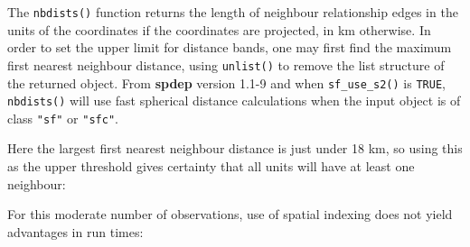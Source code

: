 \documentclass[]{book}
\newenvironment{Shaded}{\begin{snugshade}}{\end{snugshade}}
\newcommand{\CommentTok}[1]{\textcolor[rgb]{0.56,0.35,0.01}{\textit{#1}}}
\newcommand{\DataTypeTok}[1]{\textcolor[rgb]{0.13,0.29,0.53}{#1}}
\newcommand{\DecValTok}[1]{\textcolor[rgb]{0.00,0.00,0.81}{#1}}
\newcommand{\KeywordTok}[1]{\textcolor[rgb]{0.13,0.29,0.53}{\textbf{#1}}}
\newcommand{\NormalTok}[1]{#1}
\newcommand{\OperatorTok}[1]{\textcolor[rgb]{0.81,0.36,0.00}{\textbf{#1}}}
\newcommand{\OtherTok}[1]{\textcolor[rgb]{0.56,0.35,0.01}{#1}}
\newcommand{\StringTok}[1]{\textcolor[rgb]{0.31,0.60,0.02}{#1}}
\begin{document}
The \texttt{nbdists()} function returns the length of neighbour relationship edges in the units of the coordinates if the coordinates are projected, in km otherwise. In order to set the upper limit for distance bands, one may first find the maximum first nearest neighbour distance, using \texttt{unlist()} to remove the list structure of the returned object. From \textbf{spdep} version 1.1-9 and when \texttt{sf\_use\_s2()} is \texttt{TRUE}, \texttt{nbdists()} will use fast spherical distance calculations when the input object is of class \texttt{"sf"} or \texttt{"sfc"}.

\begin{Shaded}
\end{Shaded}

Here the largest first nearest neighbour distance is just under 18 km, so using this as the upper threshold gives certainty that all units will have at least one neighbour:

\begin{Shaded}
\end{Shaded}

For this moderate number of observations, use of spatial indexing does not yield advantages in run times:

\begin{Shaded}
\end{Shaded}
\end{document}
